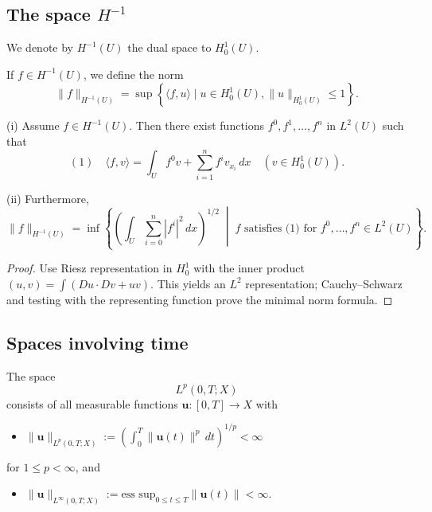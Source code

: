\subsection{The space $H^{-1}$}

\begin{definition}
\label{def:dual-space-h-minus-1}

We denote by $H^{-1}(U)$ the dual space to $H_0^1(U)$.
\end{definition}

\begin{definition}[Norm on $H^{-1}(U)$]
\label{def:norm-on-h-minus-1}

If $f \in H^{-1}(U)$, we define the norm
$$\|f\|_{H^{-1}(U)} = \sup\left\{\langle f,u\rangle \mid u \in H_0^1(U), \|u\|_{H_0^1(U)} \le 1\right\}.$$
\end{definition}

\begin{theorem}[Characterization of $H^{-1}$]
\label{thm:characterization-h-minus-1}

(i) Assume $f \in H^{-1}(U)$. Then there exist functions $f^0, f^1, \ldots, f^n$ in $L^2(U)$ such that
$$(1) \quad \langle f,v \rangle = \int_U f^0 v + \sum_{i=1}^n f^i v_{x_i}\,dx \quad (v \in H_0^1(U)).$$

(ii) Furthermore,
$$\|f\|_{H^{-1}(U)} = \inf\left\{\left(\int_U \sum_{i=0}^n |f^i|^2\,dx\right)^{1/2} \;\middle|\; f \text{ satisfies (1) for } f^0,\ldots,f^n \in L^2(U)\right\}.$$
\end{theorem}

\begin{proof}
\sketch Use Riesz representation in $H_0^1$ with the inner product $(u,v)=\int(Du\cdot Dv+uv)$. This yields an $L^2$ representation; Cauchy--Schwarz and testing with the representing function prove the minimal norm formula.
\end{proof}

\subsection{Spaces involving time}

\begin{definition}[$L^p(0,T;X)$]
\label{def:lp-time-banach-space}
The space
$$L^p(0, T; X)$$
consists of all measurable functions $\mathbf{u} : [0, T] \to X$ with
\begin{itemize}
\item[(i)] $\|\mathbf{u}\|_{L^p(0,T;X)} := \left(\int_0^T \|\mathbf{u}(t)\|^p\,dt\right)^{1/p} < \infty$
\end{itemize}
for $1 \le p < \infty$, and
\begin{itemize}
\item[(ii)] $\|\mathbf{u}\|_{L^\infty(0,T;X)} := \text{ess sup}_{0 \le t \le T} \|\mathbf{u}(t)\| < \infty$.
\end{itemize}
\end{definition}

